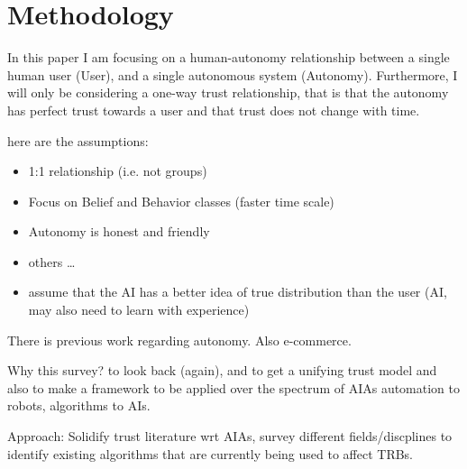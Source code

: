 \section{Methodology}
    In this paper I am focusing on a human-autonomy relationship between a single human user (User), and a single autonomous system (Autonomy). Furthermore, I will only be considering a one-way trust relationship, that is that the autonomy has perfect trust towards a user and that trust does not change with time. 

    here are the assumptions:

    \begin{itemize}
        \item 1:1 relationship (i.e. not groups)
        \item Focus on Belief and Behavior classes (faster time scale)
        \item Autonomy is honest and friendly
        \item others \ldots
        \item assume that the AI has a better idea of true distribution than the user (AI, may also need to learn with experience)
    \end{itemize}

    There is previous work regarding autonomy. Also e-commerce.

    Why this survey? to look back (again), and to get a unifying trust model and also to make a framework to be applied over the spectrum of  AIAs automation to robots, algorithms to AIs.

    Approach: Solidify trust literature wrt AIAs, survey different fields/discplines to identify existing algorithms that are currently being used to affect TRBs.
